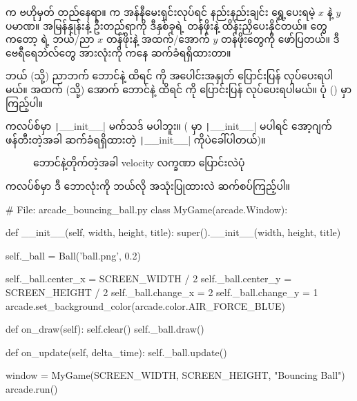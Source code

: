 \fEn{,}  က  ဗဟိုမှတ် တည်နေရာ။ \fEn{,}  က အန်နီမေးရှင်းလုပ်ရင် နည်းနည်းချင်း ရွှေ့ပေးရမဲ့ $x$ နဲ့  $y$ ပမာဏ။  အမြန်နှုန်းနဲ့ ဦးတည်ရာကို ဒီနှစ်ခုရဲ့ တန်ဖိုးနဲ့ ထိန်းညှိပေးနိုင်တယ်။ \fEn{,} \fEn{,} \fEn{,}   တွေကတော့    ရဲ့ ဘယ်/ညာ $x$ တန်ဖိုးနဲ့  အထက်/အောက် $y$ တန်ဖိုးတွေကို ဖော်ပြတယ်။ ဒီ ဗေရီရေဘဲလ်တွေ အားလုံးကို   ကနေ ဆက်ခံရရှိထားတာ။ 

ဘယ် (သို့) ညာဘက် ဘောင်နဲ့ ထိရင်  ကို အပေါင်းအနှုတ် ပြောင်းပြန် လုပ်ပေးရပါမယ်။ အထက် (သို့) အောက် ဘောင်နဲ့ ထိရင်  ကို ပြောင်းပြန် လုပ်ပေးရပါမယ်။ ပုံ (\fRefNo{\ref{fig:ch10bouncing}}) မှာ ကြည့်ပါ။

 ကလပ်စ်မှာ \texttt|__init__| မက်သဒ် မပါဘူး။ ( မှာ \texttt|__init__| မပါရင် အော့ဂျက်ဖန်တီးတဲ့အခါ ဆက်ခံရရှိထားတဲ့  \texttt|__init__| ကိုပဲခေါ်ပါတယ်)။ 

\begin{figure}[tbh!]
\caption{ဘောင်နဲ့တိုက်တဲ့အခါ velocity လက္ခဏာ ပြောင်းလဲပုံ} 
\label{fig:ch10bouncing}
\end{figure}



 ကလပ်စ်မှာ ဒီ ဘောလုံးကို ဘယ်လို အသုံးပြုထားလဲ ဆက်စပ်ကြည့်ပါ။ 
\begin{py}
# File: arcade_bouncing_ball.py
class MyGame(arcade.Window):

    def __init__(self, width, height, title):
        super().__init__(width, height, title)

        self._ball = Ball('ball.png', 0.2)

        self._ball.center_x = SCREEN_WIDTH / 2
        self._ball.center_y = SCREEN_HEIGHT / 2
        self._ball.change_x = 2
        self._ball.change_y = 1
        arcade.set_background_color(arcade.color.AIR_FORCE_BLUE)

    def on_draw(self):
        self.clear()
        self._ball.draw()

    def on_update(self, delta_time):
        self._ball.update()


window = MyGame(SCREEN_WIDTH, SCREEN_HEIGHT, "Bouncing Ball")
arcade.run()
\end{py}
%

